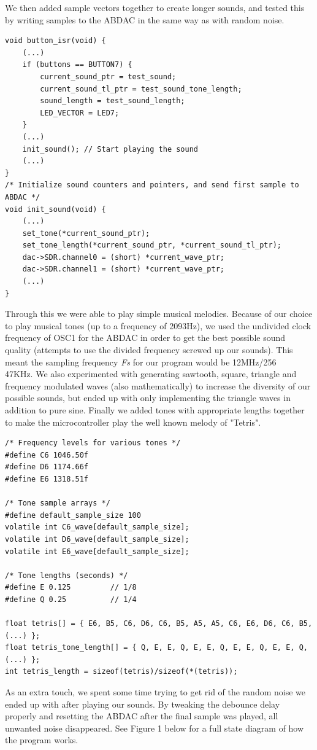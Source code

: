 \documentclass[a4paper,11pt]{article}
\begin{document}
We then added sample vectors together to create longer sounds, and tested this by writing samples to the ABDAC in the same way as with random noise.
\begin{lstlisting}
void button_isr(void) {
	(...)
	if (buttons == BUTTON7) {
		current_sound_ptr = test_sound;
		current_sound_tl_ptr = test_sound_tone_length;
		sound_length = test_sound_length;
		LED_VECTOR = LED7;
	}
	(...)
	init_sound(); // Start playing the sound
	(...)
}
/* Initialize sound counters and pointers, and send first sample to ABDAC */
void init_sound(void) {
	(...)
	set_tone(*current_sound_ptr);
	set_tone_length(*current_sound_ptr, *current_sound_tl_ptr);
	dac->SDR.channel0 = (short) *current_wave_ptr;
	dac->SDR.channel1 = (short) *current_wave_ptr;	
	(...)
}
\end{lstlisting}

Through this we were able to play simple musical melodies. Because of our choice to play musical tones (up to a frequency of 2093Hz), we used the undivided clock frequency of OSC1 for the ABDAC in order to get the best possible sound quality (attempts to use the divided frequency screwed up our sounds). This meant the sampling frequency \textit{Fs} for our program would be 12MHz/256 ~ 47KHz. We also experimented with generating sawtooth, square, triangle and frequency modulated waves (also mathematically) to increase the diversity of our possible sounds, but ended up with only implementing the triangle waves in addition to pure sine. Finally we added tones with appropriate lengths together to make the microcontroller play the well known melody of "Tetris". 

\begin{lstlisting}
/* Frequency levels for various tones */
#define C6 1046.50f
#define D6 1174.66f
#define E6 1318.51f

/* Tone sample arrays */
#define default_sample_size 100
volatile int C6_wave[default_sample_size];
volatile int D6_wave[default_sample_size];
volatile int E6_wave[default_sample_size];

/* Tone lengths (seconds) */
#define E 0.125			// 1/8
#define Q 0.25			// 1/4

float tetris[] = { E6, B5, C6, D6, C6, B5, A5, A5, C6, E6, D6, C6, B5, (...) };
float tetris_tone_length[] = { Q, E, E, Q, E, E, Q, E, E, Q, E, E, Q,  (...) };
int tetris_length = sizeof(tetris)/sizeof(*(tetris));
\end{lstlisting}

As an extra touch, we spent some time trying to get rid of the random noise we ended up with after playing our sounds. By tweaking the debounce delay properly and resetting the ABDAC after the final sample was played, all unwanted noise disappeared. See Figure 1 below for a full state diagram of how the program works.
\end{document}
